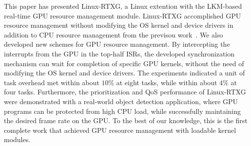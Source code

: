 \label{sec:conclusion}
This paper has presented Linux-RTXG, a Linux extention with the
LKM-based real-time GPU resource management module.
Linux-RTXG accomplished GPU resource management without modifying the OS
kernel and device drivers in addition to CPU resource management from
the previsou work~\cite{kato2009loadable, asberg2012exsched}.
We also developed new schemes for GPU resource management.
By intercepting the interrupts from the GPU in the top-half ISRs, the
developed synchronization mechanism can wait for completion of specific
GPU kernels, without the need of modifying the OS kernel and device
drivers.
The experiments indicated a unit of task overhead met within about
$10\%$ at eight tasks, while within about $4\%$ at four tasks. 
Furthermore, the prioritization and QoS performance of Linux-RTXG were
demonstrated with a real-world object detection application, where GPU
programs can be protected from high CPU load, while successfully
maintaining the desired frame rate on the GPU.
To the best of our knowledge, this is the first complete work that
achieved GPU resource management with loadable kernel modules.